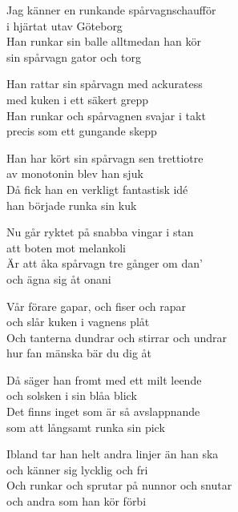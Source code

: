 \vspace{10pt}
Jag känner en runkande spårvagnschaufför\\
i hjärtat utav Göteborg\\
Han runkar sin balle alltmedan han kör\\
sin spårvagn gator och torg\par
\vspace{7pt}
Han rattar sin spårvagn med ackuratess\\
med kuken i ett säkert grepp\\
Han runkar och spårvagnen svajar i takt\\
precis som ett gungande skepp\par
\vspace{7pt}
Han har kört sin spårvagn sen trettiotre\\
av monotonin blev han sjuk\\
Då fick han en verkligt fantastisk idé\\
han började runka sin kuk\par
\vspace{7pt}
Nu går ryktet på snabba vingar i stan\\
att boten mot melankoli\\
Är att åka spårvagn tre gånger om dan’\\
och ägna sig åt onani\par
\vspace{7pt}
Vår förare gapar, och fiser och rapar\\
och slår kuken i vagnens plåt\\
Och tanterna dundrar och stirrar och undrar\\
hur fan mänska bär du dig åt\par
\vspace{7pt}
Då säger han fromt med ett milt leende\\
och solsken i sin blåa blick\\
Det finns inget som är så avslappnande\\
som att långsamt runka sin pick\par
\newpage
Ibland tar han helt andra linjer än han ska\\
och känner sig lycklig och fri\\
Och runkar och sprutar på nunnor och snutar\\
och andra som han kör förbi\par
\vspace{8pt}
